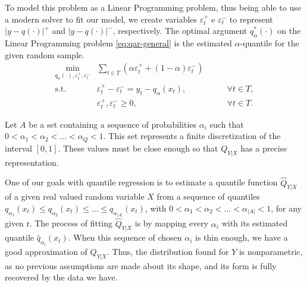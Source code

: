 To model this problem as a Linear Programming problem, thus being able to use a modern solver to fit our model,  we create variables $\varepsilon^+_t$ e $\varepsilon^-_t$ to represent $|y-q(\cdot)|^+$ and $|y-q(\cdot)|^-$, respectively. The optimal argument $q_\alpha^*(\cdot)$ on the Linear Programming problem \ref{eq:qar-general} is the estimated $\alpha$-quantile for the given random sample.
\begin{equation}
\begin{aligned}\min_{q_\alpha (\cdot),\varepsilon_{t}^{+}, \varepsilon_{t}^{-}} & \sum_{t \in T}\left(\alpha \varepsilon_{t}^{+}+(1-\alpha)\varepsilon_{t}^{-}\right) & \\
\mbox{s.t. } & \varepsilon_{t}^{+}-\varepsilon_{t}^{-}=y_{t}-q_\alpha(x_t), & \qquad\forall t \in T,\\
& \varepsilon_t^+,\varepsilon_t^- \geq 0, & \qquad \forall t \in T.
\end{aligned}
\label{eq:qar-general}
\end{equation}

Let $A$ be a set containing a sequence of probabilities  $\alpha_i$ such that $0 < \alpha_1 < \alpha_2 < \dots < \alpha_Q < 1$. This set represents a finite discretization of the interval $[0,1]$. These values must be close enough so that $Q_{Y|X}$ has a precise representation. 

One of our goals with quantile regression is to estimate a quantile function $\hat{Q}_{Y|X}$ of a given real valued random variable $X$ from a sequence of quantiles $q_{\alpha_1}(x_t) \leq q_{\alpha_2}(x_t) \leq \dots \leq q_{\alpha_{|A|}}(x_t)$, with $0 < \alpha_1 < \alpha_2 < \dots < \alpha_{|A|} < 1$, for any given $t$.
The process of fitting $\hat{Q}_{Y|X}$ is by mapping every $\alpha_i$ with its estimated quantile $\hat{q}_{\alpha_i}(x_t)$.
When this sequence of chosen $\alpha_i$ is thin enough, we have a good approximation of $Q_{Y|X}$.
Thus, the distribution found for $Y$ is nonparametric, as no previous assumptions are made about its shape, and its form is fully recovered by the data we have.

